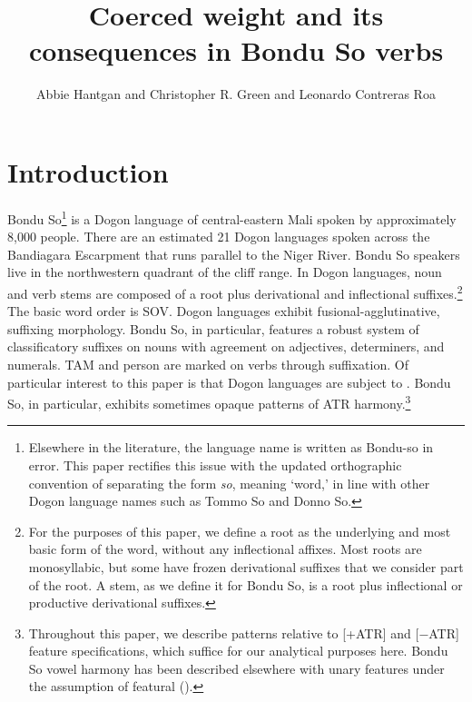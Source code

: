 \documentclass[output=paper,colorlinks,citecolor=brown]{langscibook}
\author{Abbie Hantgan\affiliation{CNRS-LLACAN} and Christopher R. Green\affiliation{Syracuse University} and Leonardo Contreras Roa\affiliation{Université de Picardie Jules Verne}}
\title{Coerced weight and its consequences in Bondu So verbs}
\begin{document}
\maketitle

\section{Introduction}
\label{sec-intro}
Bondu So\footnote{Elsewhere in the literature, the language name is written as Bondu-so in error. This paper rectifies this issue with the updated orthographic convention of separating the form \textit{so}, meaning `word,' in line with other Dogon language names such as Tommo So and Donno So.} is a Dogon language of central-eastern Mali spoken by approximately 8,000 people. There are an estimated 21 Dogon languages spoken across the Bandiagara Escarpment that runs parallel to the Niger River. Bondu So speakers live in the northwestern quadrant of the cliff range. In Dogon languages, noun and verb stems are composed of a root plus derivational and inflectional suffixes.\footnote{For the purposes of this paper, we define a root as the underlying and most basic form of the word, without any inflectional affixes. Most roots are monosyllabic, but some have frozen derivational suffixes that we consider part of the root. A stem, as we define it for Bondu So, is a root plus inflectional or productive derivational suffixes.} The basic word order is SOV. Dogon languages exhibit fusional-agglutinative, suffixing morphology. Bondu So, in particular, features a robust system of classificatory suffixes on nouns with agreement on adjectives, determiners, and numerals. TAM and person are marked on verbs through suffixation. Of particular interest to this paper is that Dogon languages are subject to . Bondu So, in particular, exhibits sometimes opaque patterns of  ATR harmony.\footnote{Throughout this paper, we describe patterns relative to [+ATR] and [−ATR] feature  specifications, which suffice for our analytical purposes here. Bondu So vowel harmony has been described elsewhere with unary features under the assumption of featural  (\citealt{GreenHantgan}).}
\end{document}
